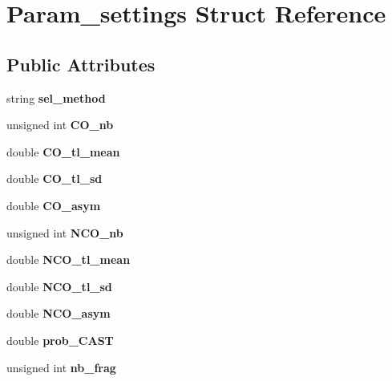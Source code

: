 \hypertarget{struct_param__settings}{}\section{Param\+\_\+settings Struct Reference}
\label{struct_param__settings}
\subsection*{Public Attributes}
\begin{DoxyCompactItemize}
\item 
\mbox{\label{struct_param__settings_a89ebc38791162634e224222d031f9fc5}} 
string {\bfseries sel\+\_\+method}
\item 
\mbox{\label{struct_param__settings_a9e7bf7f9d64ecc3cf3960720e25bcf56}} 
unsigned int {\bfseries C\+O\+\_\+nb}
\item 
\mbox{\label{struct_param__settings_a9316327a4b7c4d9ae796cf317f68ecbd}} 
double {\bfseries C\+O\+\_\+tl\+\_\+mean}
\item 
\mbox{\label{struct_param__settings_aea70fbc0f65058a5688ccc3c747fac5c}} 
double {\bfseries C\+O\+\_\+tl\+\_\+sd}
\item 
\mbox{\label{struct_param__settings_ad9d040a8e3eaa4f014af9f98bc8b6cd1}} 
double {\bfseries C\+O\+\_\+asym}
\item 
\mbox{\label{struct_param__settings_a57a12eecf5649c2a352555099f5181ff}} 
unsigned int {\bfseries N\+C\+O\+\_\+nb}
\item 
\mbox{\label{struct_param__settings_a6c8ea23424a4a8c3f52f26ebd16ddf83}} 
double {\bfseries N\+C\+O\+\_\+tl\+\_\+mean}
\item 
\mbox{\label{struct_param__settings_aaf21b8dda94fe02c46cccf0b0463558f}} 
double {\bfseries N\+C\+O\+\_\+tl\+\_\+sd}
\item 
\mbox{\label{struct_param__settings_a5cf188d877f976a966b729408f527209}} 
double {\bfseries N\+C\+O\+\_\+asym}
\item 
\mbox{\label{struct_param__settings_ad96c1b69985c74707da8401c5fe54d57}} 
double {\bfseries prob\+\_\+\+C\+A\+ST}
\item 
\mbox{\label{struct_param__settings_a0940abc023a75de8cf3282e914e17acb}} 
unsigned int {\bfseries nb\+\_\+frag}
\end{DoxyCompactItemize}


